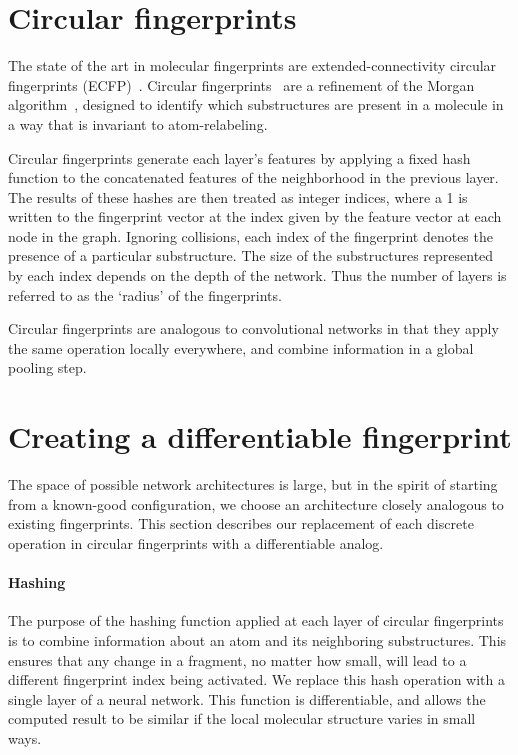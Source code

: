 \documentclass{article}
\begin{document}
\section{Circular fingerprints}
The state of the art in molecular fingerprints are extended-connectivity circular fingerprints (ECFP)~\citep{ECFP2010}.
Circular fingerprints~\citep{glem2006circular} are a refinement of the Morgan algorithm~\citep{morgan1965generation}, designed to identify which substructures are present in a molecule in a way that is invariant to atom-relabeling.

Circular fingerprints generate each layer's features by applying a fixed hash function to the concatenated features of the neighborhood in the previous layer.
The results of these hashes are then treated as integer indices, where a 1 is written to the fingerprint vector at the index given by the feature vector at each node in the graph.
Ignoring collisions, each index of the fingerprint denotes the presence of a particular substructure.
The size of the substructures represented by each index depends on the depth of the network.
Thus the number of layers is referred to as the `radius' of the fingerprints.


Circular fingerprints are analogous to convolutional networks in that they apply the same operation locally everywhere,  and combine information in a global pooling step.

\section{Creating a differentiable fingerprint}
The space of possible network architectures is large, but in the spirit of starting from a known-good configuration, we choose an architecture closely analogous to existing fingerprints.
This section describes our replacement of each discrete operation in circular fingerprints with a differentiable analog.

\paragraph{Hashing}
The purpose of the hashing function applied at each layer of circular fingerprints is to combine information about an atom and its neighboring substructures.
This ensures that any change in a fragment, no matter how small, will lead to a different fingerprint index being activated.
We replace this hash operation with a single layer of a neural network.
This function is differentiable, and allows the computed result to be similar if the local molecular structure varies in small ways.
\end{document}
